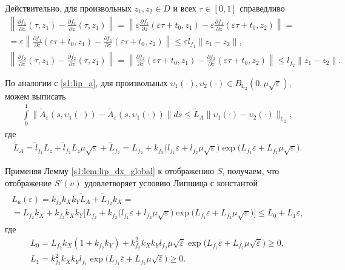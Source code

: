 \documentclass[../main.tex]{subfiles}
\begin{document}
Действительно, для произвольных $z_1, z_2 \in D$ и всех  $\tau \in [0, 1]$ справедливо
\begin{gather*}
	 \left\| \frac{\partial \widetilde{f}_1}{\partial z}(\tau, z_1) - \frac{\partial \widetilde{f}_1}{\partial z}(\tau, z_1) \right\| = 
	 \left\| \varepsilon \frac{\partial f_1}{\partial z}(\varepsilon \tau + t_0, z_1) - \varepsilon \frac{\partial f_1}{\partial z}(\varepsilon \tau + t_0, z_2) \right\| = \\ =
	 \varepsilon \left\|  \frac{\partial f_1}{\partial z}(\varepsilon \tau + t_0, z_1) - \frac{\partial f_1}{\partial z}(\varepsilon \tau + t_0, z_2) \right\| 
	 \leqslant \varepsilon l_{f_1} \| z_1 - z_2\|,  \\
	 \left\| \frac{\partial \widetilde{f}_2}{\partial z}(\tau,z_1) - \frac{\partial \widetilde{f}_2}{\partial z}(\tau,z_1) \right\| = 
	\left\| \frac{\partial f_2}{\partial z}(\varepsilon \tau + t_0,z_1) - \frac{\partial f_2}{\partial z}(\varepsilon \tau + t_0,z_2) \right\| 
	\leqslant l_{f_2} \| z_1 - z_2\|.
\end{gather*}
  
По аналогии с \eqref{s1:lip_a}, для произвольных $ \upsilon_1(\cdot), \upsilon_2(\cdot) \in B_{\mathbb{L}_2}(0,\mu\sqrt{\varepsilon})$, можем выписать
\begin{gather*}
      \int\limits_{0}^{1} \|\widetilde{A}_{\varepsilon}(s, \upsilon_1(\cdot)) - \widetilde{A}_{\varepsilon}(s, \upsilon_1(\cdot)) \| ds \leqslant \widetilde{L}_A \| \upsilon_1(\cdot) - \upsilon_2(\cdot) \|_{\mathbb{L}_2},
\end{gather*}
 где 
\begin{gather}\label{s1:eps_lip_a}
     \widetilde{L}_A = \widetilde{l}_{f_1} L_z  + \widetilde{l}_{f_2} L_z \mu \sqrt{\varepsilon} + \widetilde{L}_{f_2} = 
     L_{f_2} + k_{f_2} \Big( l_{f_1}  \varepsilon  + l_{f_2}  \mu \sqrt{\varepsilon} \Big) \exp\big( L_{f_1} \varepsilon + L_{f_2} \mu \sqrt{\varepsilon} \big).
 \end{gather}
 
 Применяя Лемму \ref{s1:lem:lip_dx_global} к отображению $S$, получаем, что отображение $S'(\upsilon)$ удовлетворяет условию Липшица с константой 
 \begin{gather}\label{s1:lip_eps}
 \begin{gathered}
 	 L_u(\varepsilon) = k_{f_2} k_X k_Y \widetilde{L}_A + \widetilde{L}_{f_2} k_X  = \\ = 
 	L_{f_2} k_X + 
 	k_{f_2} k_X k_Y \Big[ L_{f_2} + k_{f_2} \Big( l_{f_1}  \varepsilon  + l_{f_2}  \mu \sqrt{\varepsilon} \Big) \exp\big( L_{f_1} \varepsilon + L_{f_2} \mu \sqrt{\varepsilon} \big) \Big] \leqslant 
 	L_0 + L_1  \varepsilon,
 \end{gathered}
 \end{gather} 
 где 
 \begin{gather*}
 	L_0 = L_{f_2} k_X (1 + k_{f_2}  k_Y) + 
 	k_{f_2}^2 k_X k_Y l_{f_2}  \mu \sqrt{\overline{\varepsilon}} \exp\big( L_{f_1} \overline{\varepsilon} + L_{f_2} \mu  \sqrt{\overline{\varepsilon}} \big) \geqslant 0, \\
 	 L_1 = k_{f_2}^2 k_X k_Y l_{f_1} \exp\big( L_{f_1} \overline{\varepsilon} + L_{f_2} \mu \sqrt{\overline{\varepsilon}} \big) \geqslant 0.
 \end{gather*}  
 
\end{document}
